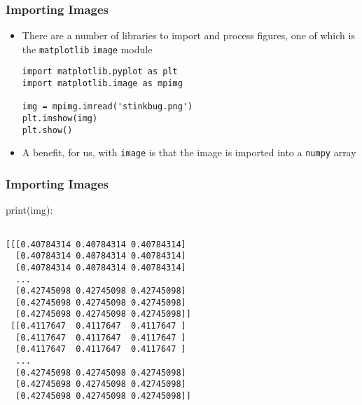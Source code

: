 \documentclass[english,14pt]{beamer}
\begin{document}
\begin{frame}[fragile]
\frametitle{Importing Images}
	\begin{itemize}
     	\item There are a number of libraries to import and process figures, one of which is the \texttt{matplotlib} \texttt{image} module 

\begin{lstlisting}[style=PStyle]
import matplotlib.pyplot as plt
import matplotlib.image as mpimg

img = mpimg.imread('stinkbug.png')
plt.imshow(img)
plt.show()
\end{lstlisting}
     	\item A benefit, for us, with \texttt{image}  is that the image is imported into a \texttt{numpy} array
    \end{itemize}
\end{frame}



\begin{frame}[fragile]
\frametitle{Importing Images}
print(img):
\begin{lstlisting}[style=PStyle]

[[[0.40784314 0.40784314 0.40784314]
  [0.40784314 0.40784314 0.40784314]
  [0.40784314 0.40784314 0.40784314]
  ...
  [0.42745098 0.42745098 0.42745098]
  [0.42745098 0.42745098 0.42745098]
  [0.42745098 0.42745098 0.42745098]]
 [[0.4117647  0.4117647  0.4117647 ]
  [0.4117647  0.4117647  0.4117647 ]
  [0.4117647  0.4117647  0.4117647 ]
  ...
  [0.42745098 0.42745098 0.42745098]
  [0.42745098 0.42745098 0.42745098]
  [0.42745098 0.42745098 0.42745098]]

\end{lstlisting}

\end{frame}
\end{document}
